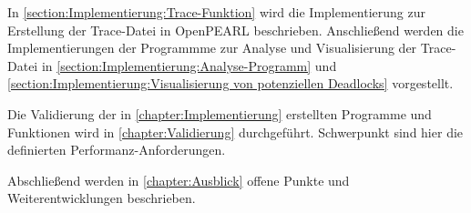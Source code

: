 In \cref{section:Implementierung:Trace-Funktion} wird die Implementierung zur
Erstellung der Trace-Datei in OpenPEARL beschrieben. Anschließend werden die
Implementierungen der Programmme zur Analyse und Visualisierung der Trace-Datei
in \cref{section:Implementierung:Analyse-Programm} und
\cref{section:Implementierung:Visualisierung von potenziellen Deadlocks}
vorgestellt.

Die Validierung der in \cref{chapter:Implementierung} erstellten Programme und
Funktionen wird in \cref{chapter:Validierung} durchgeführt. Schwerpunkt sind
hier die definierten Performanz-Anforderungen.

Abschließend werden in \cref{chapter:Ausblick} offene Punkte und
Weiterentwicklungen beschrieben.